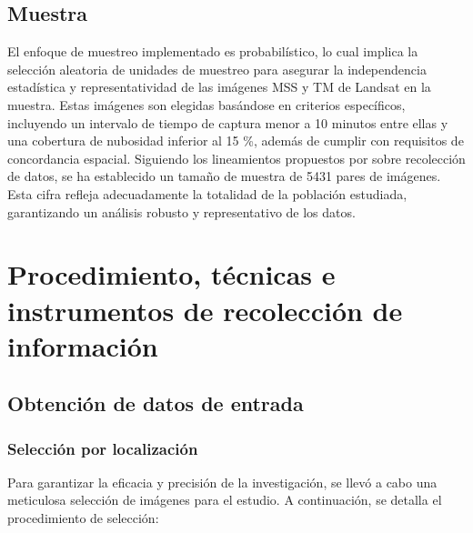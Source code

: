         \subsection{Muestra}
            El enfoque de muestreo implementado es probabilístico, lo cual implica la selección aleatoria de unidades de muestreo para asegurar la independencia estadística y representatividad de las imágenes MSS y TM de Landsat en la muestra. Estas imágenes son elegidas basándose en criterios específicos, incluyendo un intervalo de tiempo de captura menor a 10 minutos entre ellas y una cobertura de nubosidad inferior al 15 \%, además de cumplir con requisitos de concordancia espacial. Siguiendo los lineamientos propuestos por \textcite{hernandez2014recoleccion} sobre recolección de datos, se ha establecido un tamaño de muestra de 5431 pares de imágenes. Esta cifra refleja adecuadamente la totalidad de la población estudiada, garantizando un análisis robusto y representativo de los datos.
            
    \section{Procedimiento, técnicas e instrumentos de recolección de información}

       \subsection{Obtención de datos de entrada}
            \subsubsection{Selección por localización}
                Para garantizar la eficacia y precisión de la investigación, se llevó a cabo una meticulosa selección de imágenes para el estudio. A continuación, se detalla el procedimiento de selección:
                
